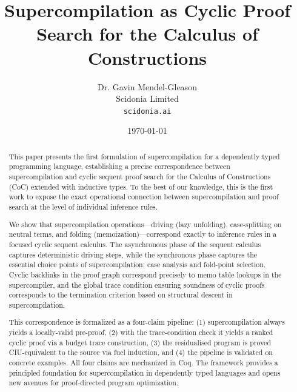 \documentclass[11pt]{article}
\title{Supercompilation as Cyclic Proof Search for the Calculus of Constructions}
\author{Dr. Gavin Mendel-Gleason\\Scidonia Limited\\\texttt{scidonia.ai}}
\date{\today}
\begin{document}
\maketitle

\begin{abstract}
This paper presents the first formulation of supercompilation for a dependently typed programming language, establishing a precise correspondence between supercompilation and cyclic sequent proof search for the Calculus of Constructions (CoC) extended with inductive types.
To the best of our knowledge, this is the first work to expose the exact operational connection between supercompilation and proof search at the level of individual inference rules.

We show that supercompilation operations---driving (lazy unfolding), case-splitting on neutral terms, and folding (memoization)---correspond exactly to inference rules in a focused cyclic sequent calculus.
The asynchronous phase of the sequent calculus captures deterministic driving steps, while the synchronous phase captures the essential choice points of supercompilation: case analysis and fold-point selection.
Cyclic backlinks in the proof graph correspond precisely to memo table lookups in the supercompiler, and the global trace condition ensuring soundness of cyclic proofs corresponds to the termination criterion based on structural descent in supercompilation.

This correspondence is formalized as a four-claim pipeline: (1) supercompilation always yields a locally-valid pre-proof, (2) with the trace-condition check it yields a ranked cyclic proof via a budget trace construction, (3) the residualised program is proved CIU-equivalent to the source via fuel induction, and (4) the pipeline is validated on concrete examples. All four claims are mechanized in Coq.
The framework provides a principled foundation for supercompilation in dependently typed languages and opens new avenues for proof-directed program optimization.
\end{abstract}

\tableofcontents













\end{document}

